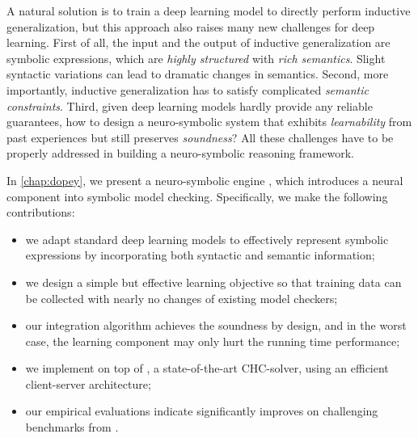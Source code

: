
A natural solution is to train a deep learning model to directly perform inductive generalization, but this approach also raises many new challenges for deep learning. 
First of all, the input and the output of inductive generalization are symbolic expressions, which are \textit{highly structured} with \textit{rich semantics}. 
Slight syntactic variations can lead to dramatic changes in semantics.
Second, more importantly, inductive generalization has to satisfy complicated \textit{semantic constraints}. 
Third, given deep learning models hardly provide any reliable guarantees, how to design a neuro-symbolic system that exhibits \textit{learnability} from past experiences but still preserves \textit{soundness}?
All these challenges have to be properly addressed in building a neuro-symbolic reasoning framework. 

In \cref{chap:dopey}, we present a neuro-symbolic engine \dpy, which introduces a neural component into symbolic model checking. Specifically, we make the following contributions: 
\begin{itemize}
    \item we adapt standard deep learning models to effectively represent symbolic expressions by incorporating both syntactic and semantic information;
    \item we design a simple but effective learning objective so that training data can be collected with nearly no changes of existing model checkers; 
    \item our integration algorithm achieves the soundness by design, and in the worst case, the learning component may only hurt the running time performance; 
    \item we implement \dpy on top of \spc, a state-of-the-art CHC-solver, using an efficient client-server architecture;
    \item our empirical evaluations indicate \dpy significantly improves \spc on 
    challenging benchmarks from \chccomp.
\end{itemize}
